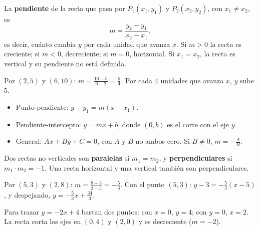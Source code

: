 \documentclass[11pt]{article}
\begin{document}
\begin{definicion}[Pendiente]
La \textbf{pendiente} de la recta que pasa por $P_1(x_1, y_1)$ y
$P_2(x_2, y_2)$, con $x_1 \neq x_2$, es
\[ m = \frac{y_2 - y_1}{x_2 - x_1}, \]
es decir, cuánto cambia $y$ por cada unidad que avanza $x$. Si $m > 0$ la
recta es creciente; si $m < 0$, decreciente; si $m = 0$, horizontal. Si
$x_1 = x_2$, la recta es vertical y su pendiente no está definida.
\end{definicion}

\begin{ejemplo}
Por $(2, 5)$ y $(6, 10)$: $m = \frac{10 - 5}{6 - 2} = \frac{5}{4}$. Por cada
$4$ unidades que avanza $x$, $y$ sube $5$.
\end{ejemplo}

\begin{teorema}
\begin{itemize}
  \item Punto-pendiente: $y - y_1 = m(x - x_1)$.
  \item Pendiente-intercepto: $y = mx + b$, donde $(0, b)$ es el corte con el
        eje $y$.
  \item General: $Ax + By + C = 0$, con $A$ y $B$ no ambos cero. Si $B \neq 0$,
        $m = -\frac{A}{B}$.
\end{itemize}
Dos rectas no verticales son \textbf{paralelas} si $m_1 = m_2$, y
\textbf{perpendiculares} si $m_1 \cdot m_2 = -1$. Una recta horizontal y una
vertical también son perpendiculares.
\end{teorema}

\begin{ejemplo}
Por $(5, 3)$ y $(2, 8)$: $m = \frac{8 - 3}{2 - 5} = -\frac{5}{3}$. Con el punto
$(5, 3)$: $y - 3 = -\frac{5}{3}(x - 5)$, y despejando,
$y = -\frac{5}{3}x + \frac{34}{3}$.
\end{ejemplo}

\begin{ejemplo}
Para trazar $y = -2x + 4$ bastan dos puntos: con $x = 0$, $y = 4$; con $y = 0$,
$x = 2$. La recta corta los ejes en $(0, 4)$ y $(2, 0)$ y es decreciente
($m = -2$).

\begin{center}
\end{center}
\end{ejemplo}
\end{document}
